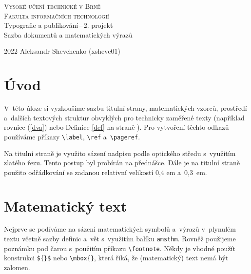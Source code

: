 \documentclass[11pt, a4paper, twocolumn]{article}
\begin{document}
\begin{titlepage}
\begin{center}
\huge
\textsc{\Huge Vysoké učení technické v Brně\\
\huge Fakulta informačních technologií}\\
\LARGE Typografie a publikování\,--\,2. projekt\\
Sazba dokumentů a matematických výrazů\\
\end{center}
{\Large 2022 \hfill
Aleksandr Shevchenko (xshevc01)}
\end{titlepage}
\section*{Úvod}

V~této úloze si vyzkoušíme sazbu titulní strany, matematických vzorců, prostředí a~dalších textových struktur obvyklých pro technicky zaměřené texty (například rovnice (\ref{dva}) nebo Definice \ref{def} na straně \pageref{def}). Pro vytvoření těchto odkazů používáme příkazy \verb|\label|, \verb|\ref| a~\verb|\pageref|.

Na titulní straně je využito sázení nadpisu podle optického středu s~využitím zlatého řezu. Tento postup byl probírán na přednášce. Dále je na titulní straně použito odřádkování se zadanou relativní velikostí 0,4 em a~0,3~em.


\section{Matematický text}

Nejprve se podíváme na sázení matematických symbolů a~výrazů v~plynulém textu včetně sazby definic a~vět s~využitím balíku \verb|amsthm|. Rovněž použijeme poznámku pod čarou s~použitím příkazu \verb|\footnote|. Někdy je vhodné použít konstrukci \verb|${}$| nebo \verb|\mbox{}|, která říká, že (matematický) text nemá být zalomen. 
\end{document}
